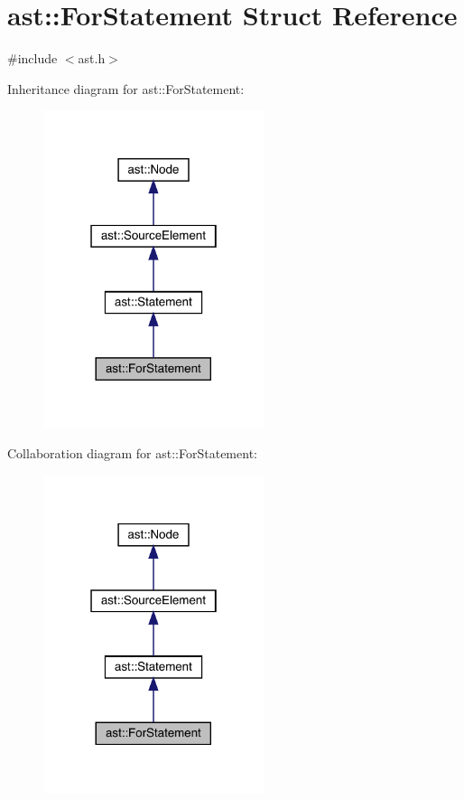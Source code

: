 \hypertarget{structast_1_1_for_statement}{}\section{ast\+:\+:For\+Statement Struct Reference}
\label{structast_1_1_for_statement}


{\ttfamily \#include $<$ast.\+h$>$}



Inheritance diagram for ast\+:\+:For\+Statement\+:\nopagebreak
\begin{figure}[H]
\begin{center}
\leavevmode
\includegraphics[width=183pt]{structast_1_1_for_statement__inherit__graph}
\end{center}
\end{figure}


Collaboration diagram for ast\+:\+:For\+Statement\+:\nopagebreak
\begin{figure}[H]
\begin{center}
\leavevmode
\includegraphics[width=183pt]{structast_1_1_for_statement__coll__graph}
\end{center}
\end{figure}
